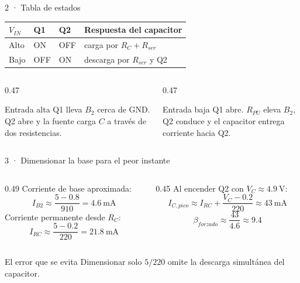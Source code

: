 \documentclass[aspectratio=169]{beamer}
\begin{document}
\begin{frame}{2 · Tabla de estados}
  \begin{center}
    \begin{tabular}{llll}
      \toprule
      $V_{IN}$ & Q1 & Q2 & Respuesta del capacitor \\
      \midrule
      Alto & ON & OFF & carga por $R_C+R_{ser}$ \\
      Bajo & OFF & ON & descarga por $R_{ser}$ y Q2 \\
      \bottomrule
    \end{tabular}
  \end{center}
  \vfill
  \begin{columns}[T]
    \begin{column}{0.47\textwidth}
      \begin{exampleblock}{Entrada alta}
        Q1 lleva $B_2$ cerca de GND. Q2 abre y la fuente carga $C$ a través de
        dos resistencias.
      \end{exampleblock}
    \end{column}
    \begin{column}{0.47\textwidth}
      \begin{exampleblock}{Entrada baja}
        Q1 abre. $R_{PU}$ eleva $B_2$, Q2 conduce y el capacitor entrega
        corriente hacia Q2.
      \end{exampleblock}
    \end{column}
  \end{columns}
\end{frame}

\begin{frame}{3 · Dimensionar la base para el peor instante}
  \begin{columns}[T]
    \begin{column}{0.49\textwidth}
      Corriente de base aproximada:
      \[
        I_{B2}\approx\frac{5-0.8}{910}=\SI{4.6}{\milli\ampere}
      \]
      Corriente permanente desde $R_C$:
      \[
        I_{RC}\approx\frac{5-0.2}{220}=\SI{21.8}{\milli\ampere}
      \]
    \end{column}
    \begin{column}{0.45\textwidth}
      Al encender Q2 con $V_C\approx\SI{4.9}{\volt}$:
      \[
        I_{C,pico}\approx I_{RC}+\frac{V_C-0.2}{220}
        \approx\SI{43}{\milli\ampere}
      \]
      \[
        \beta_{forzado}\approx\frac{43}{4.6}\approx9.4
      \]
    \end{column}
  \end{columns}
  \begin{alertblock}{El error que se evita}
    Dimensionar solo $5/220$ omite la descarga simultánea del capacitor.
  \end{alertblock}
\end{frame}
\end{document}
